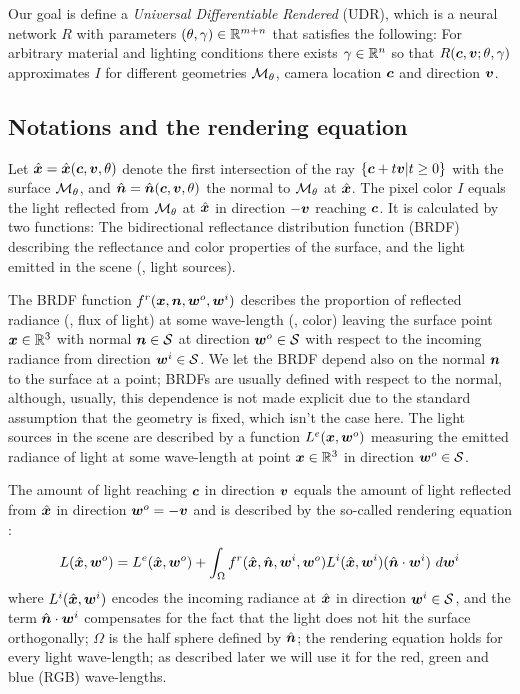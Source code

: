 \documentclass[runningheads]{llncs}
\begin{document}
Our goal is define a \emph{Universal Differentiable Rendered} (UDR), which is a neural network $R$ with parameters $(\theta,\gamma)\in\mathbb R^{m+n}$ that satisfies the following: For arbitrary material and lighting conditions there exists $\gamma\in\mathbb R^n$ so that $R({\bm{c}},{\bm{v}};\theta,\gamma)$ approximates $I$ for different geometries ${\mathcal{M}}_\theta$, camera location ${\bm{c}}$ and direction ${\bm{v}}$.   


\subsection{Notations and the rendering equation}
Let ${\hat{\bm{x}}}={\hat{\bm{x}}}({\bm{c}},{\bm{v}},\theta)$ denote the first intersection of the ray $\left\{{\bm{c}}+t{\bm{v}}\vert t\geq 0\right\}$ with the surface ${\mathcal{M}}_\theta$, and ${\hat{\bm{n}}}={\hat{\bm{n}}}({\bm{c}},{\bm{v}},\theta)$ the normal to ${\mathcal{M}}_\theta$ at ${\hat{\bm{x}}}$. 
The pixel color $I$ equals the light reflected from ${\mathcal{M}}_\theta$ at ${\hat{\bm{x}}}$ in direction $-{\bm{v}}$ reaching ${\bm{c}}$. It is calculated by two functions: The bidirectional reflectance distribution function (BRDF) describing the reflectance and color properties of the surface, and the light emitted in the scene (\ie, light sources).

The BRDF function $f^r({\bm{x}},{\bm{n}},{\bm{w}}^o,{\bm{w}}^i)$ describes the proportion of reflected radiance (\ie, flux of light) at some wave-length (\ie, color) leaving the surface point ${\bm{x}}\in\mathbb R^3$ with normal ${\bm{n}}\in{\mathcal{S}}$ at direction ${\bm{w}}^o\in{\mathcal{S}}$ with respect to the incoming radiance from direction ${\bm{w}}^i\in{\mathcal{S}}$. We let the BRDF depend also on the normal ${\bm{n}}$ to the surface at a point; BRDFs are usually defined with respect to the normal, although, usually, this dependence is not made explicit due to the standard assumption that the geometry is fixed, which isn't the case here. 
%
The light sources in the scene are described by a function $L^e({\bm{x}},{\bm{w}}^o)$ measuring the emitted radiance of light at some wave-length at point ${\bm{x}}\in\mathbb R^3$ in direction ${\bm{w}}^o\in{\mathcal{S}}$. 

The amount of light reaching ${\bm{c}}$ in direction ${\bm{v}}$ equals the amount of light reflected from ${\hat{\bm{x}}}$ in direction ${\bm{w}}^o=-{\bm{v}}$ and is described by the so-called rendering equation \cite{kajiya1986rendering,immel1986radiosity}:
\begin{equation}\label{e:render}
    L(\vhx,\vw^o) = L^e(\vhx,\vw^o)+\int_{\Omega} f^r(\vhx,\vhn,\vw^i,\vw^o) L^i(\vhx,\vw^i)(\vhn \cdot \vw^i)\ d\vw^i 
\end{equation}
where $L^i({\hat{\bm{x}}},{\bm{w}}^i)$ encodes the incoming radiance at ${\hat{\bm{x}}}$ in direction ${\bm{w}}^i\in{\mathcal{S}}$, and the term ${\hat{\bm{n}}}\cdot{\bm{w}}^i$ compensates for the fact that the light does not hit the surface orthogonally; $\Omega$ is the half sphere defined by ${\hat{\bm{n}}}$; the rendering equation holds for every light wave-length; as described later we will use it for the red, green and blue (RGB) wave-lengths. 
\end{document}

